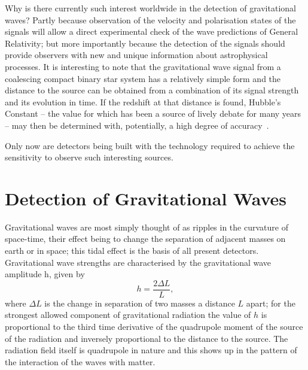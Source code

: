 \documentclass{article}
\begin{document}
Why is there currently such interest worldwide in the detection of gravitational
waves? Partly because observation of the velocity and polarisation states of the
signals will allow a direct experimental check of the wave predictions of
General Relativity; but more importantly because the detection of the signals
should provide observers with new and unique information about astrophysical
processes. It is interesting to note that the gravitational wave signal from a
coalescing compact binary star system has a relatively simple form and the
distance to the source can be obtained from a combination of its signal strength
and its evolution in time. If the redshift at that distance is found, Hubble's
Constant -- the value for which has been a source of lively debate for many
years -- may then be determined with, potentially, a high degree of
accuracy~\cite{Schutz,Holtz:2005}.

Only now are detectors being built with the technology required to achieve the
sensitivity to observe such interesting sources.


\newpage

\section{Detection of Gravitational Waves}
\label{section:Detection}

Gravitational waves are most simply thought of as ripples in the curvature of
space-time, their effect being to change the separation of adjacent masses on
earth or in space; this tidal effect is the basis of all present detectors.
Gravitational wave strengths are characterised by the gravitational wave
amplitude h, given by
%
\begin{equation}
  h = \frac{2 \Delta L} L,
  \label{equation:h}
\end{equation}
%
where $\Delta L$ is the change in separation of two masses a distance $L$ apart;
for the strongest allowed component of gravitational radiation the value of $h$
is proportional to the third time derivative of the quadrupole moment of the
source of the radiation and inversely proportional to the distance to the
source. The radiation field itself is quadrupole in nature and this shows up in
the pattern of the interaction of the waves with matter.
\end{document}
